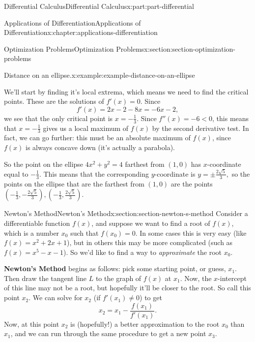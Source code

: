 \documentclass[twoside,10pt,]{book}
\newcommand{\terminology}[1]{\textbf{#1}}
\numberwithin{equation}{part}
\begin{document}
\begin{partptx}{Differential Calculus}{}{Differential Calculus}{}{}{x:part:part-differential}
\begin{chapterptx}{Applications of Differentiation}{}{Applications of Differentiation}{}{}{x:chapter:applications-differentiation}
\begin{sectionptx}{Optimization Problems}{}{Optimization Problems}{}{}{x:section:section-optimization-problems}
\begin{example}{Distance on an ellipse.}{x:example:example-distance-on-an-ellipse}
%
\par
We'll start by finding it's local extrema, which means we need to find the critical points. These are the solutions of \(f'(x) = 0\). Since%
\begin{equation*}
f'(x) = 2x - 2 - 8x = -6x - 2,
\end{equation*}
we see that the only critical point is \(x = -\frac{1}{3}\). Since \(f''(x) = -6 < 0\), this means that \(x = -\frac{1}{3}\) gives us a local maximum of \(f(x)\) by the second derivative test. In fact, we can go further: this must be an absolute maximum of \(f(x)\), since \(f(x)\) is always concave down (it's actually a parabola).%
\par
So the point on the ellipse \(4x^{2} + y^{2} = 4\) farthest from \((1,0)\) has \(x\)-coordinate equal to \(-\frac{1}{3}\). This means that the corresponding \(y\)-coordinate is \(y = \pm\frac{2\sqrt{5}}{3},\) so the points on the ellipse that are the farthest from \((1,0)\) are the points \((-\frac{1}{3}, -\frac{2\sqrt{5}}{3}), (-\frac{1}{3}, \frac{2\sqrt{5}}{3}).\)%
\end{example}
\end{sectionptx}
%
%
\typeout{************************************************}
\typeout{************************************************}
%
\begin{sectionptx}{Newton's Method}{}{Newton's Method}{}{}{x:section:section-newton-s-method}
Consider a differentiable function \(f(x)\), and suppose we want to find a root of \(f(x)\), which is a number \(x_{0}\) such that \(f(x_{0}) = 0\). In some cases this is very easy (like \(f(x) = x^{2} + 2x + 1\)), but in others this may be more complicated (such as \(f(x) = x^{5} - x  - 1\)). So we'd like to find a way to \emph{approximate} the root \(x_{0}\).%
\par
\terminology{Newton's Method} begins as follows: pick some starting point, or guess, \(x_{1}\). Then draw the tangent line \(L\) to the graph of \(f(x)\) at \(x_{1}\). Now, the \(x\)-intercept of this line may not be a root, but hopefully it'll be closer to the root. So call this point \(x_{2}\). We can solve for \(x_{2}\) (if \(f'(x_{1})\neq0\)) to get%
\begin{equation*}
x_{2} = x_{1} - \frac{f(x_{1})}{f'(x_{1})}.
\end{equation*}
Now, at this point \(x_{2}\) is (hopefully!) a better approximation to the root \(x_{0}\) than \(x_{1}\), and we can run through the same procedure to get a new point \(x_{3}\).%
\par

\end{sectionptx}
\end{chapterptx}
\end{partptx}
\end{document}

